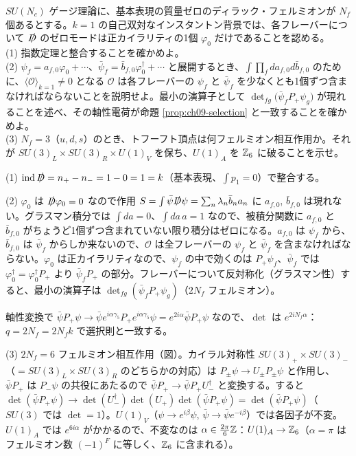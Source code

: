 \begin{problem}[難易度 B]\label{ch09-prob-thooft}
$SU(N_c)$ ゲージ理論に、基本表現の質量ゼロのディラック・フェルミオンが $N_f$ 個あるとする。$k=1$ の自己双対なインスタントン背景では、各フレーバーについて $\slashed D$ のゼロモードは正カイラリティの1個 $\varphi_0$ だけであることを認める。\\
(1) 指数定理と整合することを確かめよ。\\
(2) $\psi_f=a_{f,0}\varphi_0+\cdots$、$\bar\psi_f=\bar b_{f,0}\varphi_0^\dagger+\cdots$ と展開するとき、$\int\prod_fda_{f,0}d\bar b_{f,0}$ のために、$\langle\mathcal O\rangle_{k=1}\ne0$ となる $\mathcal O$ は各フレーバーの $\psi_f$ と $\bar\psi_f$ を少なくとも1個ずつ含まなければならないことを説明せよ。最小の演算子として $\det_{fg}\bigl(\bar\psi_fP_+\psi_g\bigr)$ が現れることを述べ、その軸性電荷が命題 \ref{prop:ch09-selection} と一致することを確かめよ。\\
(3) $N_f=3$（$u,d,s$）のとき、トフーフト頂点は何フェルミオン相互作用か。それが $SU(3)_L\times SU(3)_R\times U(1)_V$ を保ち、$U(1)_A$ を $\mathbb{Z}_6$ に破ることを示せ。
\end{problem}

\begin{solution}
(1) $\operatorname{ind}\slashed D=n_+-n_-=1-0=1=k$（基本表現、$\int p_1=0$）で整合する。

(2) $\varphi_0$ は $\slashed D\varphi_0=0$ なので作用 $S=\int\bar\psi\slashed D\psi=\sum_n\lambda_n\bar b_na_n$ に $a_{f,0}$, $\bar b_{f,0}$ は現れない。グラスマン積分では $\int da=0$、$\int da\,a=1$ なので、被積分関数に $a_{f,0}$ と $\bar b_{f,0}$ がちょうど1個ずつ含まれていない限り積分はゼロになる。$a_{f,0}$ は $\psi_f$ から、$\bar b_{f,0}$ は $\bar\psi_f$ からしか来ないので、$\mathcal O$ は全フレーバーの $\psi_f$ と $\bar\psi_f$ を含まなければならない。$\varphi_0$ は正カイラリティなので、$\psi_f$ の中で効くのは $P_+\psi_f$、$\bar\psi_f$ では $\varphi_0^\dagger=\varphi_0^\dagger P_+$ より $\bar\psi_fP_+$ の部分。フレーバーについて反対称化（グラスマン性）すると、最小の演算子は $\det_{fg}(\bar\psi_fP_+\psi_g)$（$2N_f$ フェルミオン）。

軸性変換で $\bar\psi P_+\psi\to\bar\psi e^{i\alpha\gamma_5}P_+e^{i\alpha\gamma_5}\psi=e^{2i\alpha}\bar\psi P_+\psi$ なので、$\det$ は $e^{2iN_f\alpha}$：$q=2N_f=2N_fk$ で選択則と一致する。

(3) $2N_f=6$ フェルミオン相互作用（図）。カイラル対称性 $SU(3)_+\times SU(3)_-$（$=SU(3)_L\times SU(3)_R$ のどちらかの対応）は $P_\pm\psi\to U_\pm P_\pm\psi$ と作用し、$\bar\psi P_+$ は $P_-\psi$ の共役にあたるので $\bar\psi P_+\to\bar\psi P_+U_-^\dagger$ と変換する。すると$\det(\bar\psi P_+\psi)\to\det(U_-^\dagger)\det(U_+)\det(\bar\psi P_+\psi)=\det(\bar\psi P_+\psi)$（$SU(3)$ では $\det=1$）。$U(1)_V$（$\psi\to e^{i\beta}\psi$, $\bar\psi\to\bar\psi e^{-i\beta}$）では各因子が不変。$U(1)_A$ では $e^{6i\alpha}$ がかかるので、不変なのは $\alpha\in\frac{2\pi}{6}\mathbb{Z}$：$U(1)_A\to\mathbb{Z}_6$（$\alpha=\pi$ はフェルミオン数 $(-1)^F$ に等しく、$\mathbb{Z}_6$ に含まれる）。
\end{solution}

